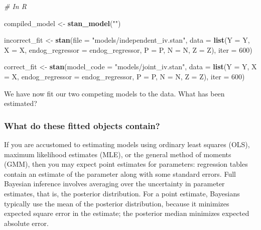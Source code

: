 \documentclass[]{book}
\newenvironment{Shaded}{\begin{snugshade}}{\end{snugshade}}
\newcommand{\KeywordTok}[1]{\textcolor[rgb]{0.13,0.29,0.53}{\textbf{{#1}}}}
\newcommand{\DataTypeTok}[1]{\textcolor[rgb]{0.13,0.29,0.53}{{#1}}}
\newcommand{\DecValTok}[1]{\textcolor[rgb]{0.00,0.00,0.81}{{#1}}}
\newcommand{\StringTok}[1]{\textcolor[rgb]{0.31,0.60,0.02}{{#1}}}
\newcommand{\CommentTok}[1]{\textcolor[rgb]{0.56,0.35,0.01}{\textit{{#1}}}}
\newcommand{\NormalTok}[1]{{#1}}
\begin{document}
\begin{Shaded}
\begin{Highlighting}[]
\CommentTok{# In R}

\NormalTok{compiled_model <-}\StringTok{ }\KeywordTok{stan_model}\NormalTok{(}\StringTok{""}\NormalTok{)}

\NormalTok{incorrect_fit <-}\StringTok{ }\KeywordTok{stan}\NormalTok{(}\DataTypeTok{file =} \StringTok{"models/independent_iv.stan"}\NormalTok{,}
                      \DataTypeTok{data =} \KeywordTok{list}\NormalTok{(}\DataTypeTok{Y =} \NormalTok{Y,}
                                  \DataTypeTok{X =} \NormalTok{X,}
                                  \DataTypeTok{endog_regressor =} \NormalTok{endog_regressor,}
                                  \DataTypeTok{P =} \NormalTok{P, }
                                  \DataTypeTok{N =} \NormalTok{N,}
                                  \DataTypeTok{Z =} \NormalTok{Z), }
                      \DataTypeTok{iter =} \DecValTok{600}\NormalTok{)}

\NormalTok{correct_fit <-}\StringTok{ }\KeywordTok{stan}\NormalTok{(}\DataTypeTok{model_code =} \StringTok{"models/joint_iv.stan"}\NormalTok{,}
                    \DataTypeTok{data =} \KeywordTok{list}\NormalTok{(}\DataTypeTok{Y =} \NormalTok{Y,}
                                \DataTypeTok{X =} \NormalTok{X,}
                                \DataTypeTok{endog_regressor =} \NormalTok{endog_regressor,}
                                \DataTypeTok{P =} \NormalTok{P, }
                                \DataTypeTok{N =} \NormalTok{N,}
                                \DataTypeTok{Z =} \NormalTok{Z),}
                    \DataTypeTok{iter =} \DecValTok{600}\NormalTok{)}
\end{Highlighting}
\end{Shaded}

We have now fit our two competing models to the data. What has been
estimated?

\subsubsection{What do these fitted objects
contain?}\label{what-do-these-fitted-objects-contain}

If you are accustomed to estimating models using ordinary least squares
(OLS), maximum likelihood estimates (MLE), or the general method of
moments (GMM), then you may expect point estimates for parameters:
regression tables contain an estimate of the parameter along with some
standard errors. Full Bayesian inference involves averaging over the
uncertainty in parameter estimates, that is, the posterior distribution.
For a point estimate, Bayesians typically use the mean of the posterior
distribution, because it minimizes expected square error in the
estimate; the posterior median minimizes expected absolute error.
\end{document}
